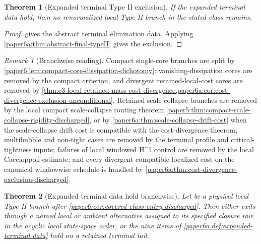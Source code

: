 \documentclass[11pt]{amsart}
\def\({}%
\def\){}%
\theoremstyle{plain}
\newtheorem{theorem}{Theorem}[section]
\theoremstyle{definition}
\theoremstyle{remark}
\newtheorem{remark}[remark]{Remark}
\begin{document}
\begin{theorem}[Expanded terminal Type II exclusion]
\label{paper6a:thm:expanded-terminal-typeII}
If the expanded terminal data hold, then no renormalized local Type II
branch in the stated class remains.
\end{theorem}

\begin{proof}
 gives the abstract terminal elimination
data.  Applying \cref{paper6a:thm:abstract-final-typeII} gives the
exclusion.
\end{proof}

\begin{remark}[Branchwise reading]
Compact single-core branches are split by
\cref{paper6:lem:compact-core-dissipation-dichotomy}: vanishing-dissipation
cores are removed by the compact criterion, and divergent retained-local-cost
cores are removed by
\cref{thm:c3-local-retained-mass-cost-divergence,paper6a:cor:cost-divergence-exclusion-unconditional}.
Retained scale-collapse branches are removed by the local compact
scale-collapse routing theorem
\cref{paper5:thm:compact-scale-collapse-rigidity-discharged}, or by
\cref{paper6a:thm:scale-collapse-drift-cost} when the scale-collapse drift cost
is compatible with the cost-divergence theorem; multibubble and non-tight cases
are removed by the terminal profile and critical-tightness inputs; failures of
local windowed \(H^1\) control are removed by the local Caccioppoli estimate;
and every divergent compatible localized cost on the canonical windowwise
schedule is handled by
\cref{paper6a:thm:cost-divergence-exclusion-discharged}.
\end{remark}

\begin{theorem}[Expanded terminal data hold branchwise]
\label{paper6a:thm:expanded-terminal-data-branchwise}
Let \(\omega\) be a physical local Type II branch after
\cref{paper6:cor:covered-class-entry-discharged}.  Then either \(\omega\)
exits through a named local or ambient alternative assigned to its specified
closure row in the acyclic local state-space order, or the nine items of
\cref{paper6a:def:expanded-terminal-data} hold on a retained terminal tail.
\end{theorem}
\end{document}
